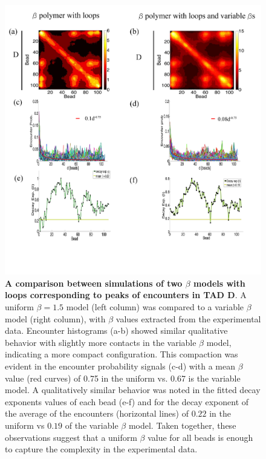 \documentclass[12pt]{article}
\begin{document}
\begin{figure}[H]
\includegraphics[scale=0.55]{Figure06_betaModelWithPeaks}
\caption{\textbf{A comparison between simulations of two $\beta$ models with loops corresponding to peaks of encounters in TAD D}. A uniform $\beta=1.5$ model (left column) was compared to a variable $\beta$ model (right column), with $\beta$ values extracted from the experimental data. Encounter histograms (a-b) showed similar qualitative behavior with slightly more contacts in the variable $\beta$ model, indicating a more compact configuration. This compaction was evident in the encounter probability signals (c-d) with a mean $\beta$ value (red curves) of 0.75 in the uniform vs. 0.67 is the variable model. A qualitatively similar behavior was noted in the fitted decay exponents values of each bead (e-f) and for the decay exponent of the average of the encounters (horizontal lines) of $0.22$ in the uniform vs $0.19$ of the variable $\beta$ model. Taken together, these observations suggest that a uniform $\beta$ value for all beads is enough to capture the complexity in the experimental data.}
\label{simulationWithBetaPolymerWithLoops}
\end{figure}


\end{document}
